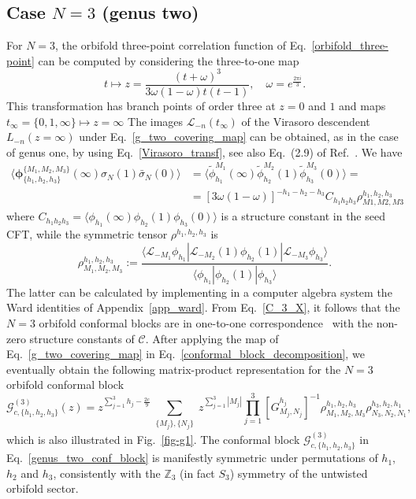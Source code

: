 \documentclass[a4paper,11pt]{article}
\begin{document}
\subsection{Case $N=3$ (genus two)}

For $N=3$, the orbifold three-point correlation 
function of Eq.~\eqref{orbifold_three-point} can be computed 
by considering the three-to-one map~\cite{Collier}
\begin{equation}\label{g_two_covering_map}
 t\mapsto z =\frac{(t+\omega)^3}{3\omega(1-\omega)t(t-1)},\quad \omega=e^{\frac{2\pi i}{3}}.
\end{equation}
This transformation has branch points of order three at 
$z=0$ and $1$ and maps $t_{\infty}=\{0, 1, \infty\} \mapsto z=\infty$ 
The images $\mathcal{L}_{-n}(t_{\infty})$ of the Virasoro descendent $L_{-n}(z=\infty)$ 
under Eq.~\eqref{g_two_covering_map} can be obtained, as in the 
case of genus one, by using Eq.~\eqref{Virasoro_transf}, see also Eq.~(2.9)
of Ref.~\cite{Collier}. We have 
\begin{align}\label{C_3_X}
 \langle \boldsymbol{\phi}^{\{M_1,M_2,M_3\}}_{\{h_1,h_2,h_3\}}(\infty) \sigma_{N}(1)\bar{\sigma}_{N}(0)\rangle &=\langle \tilde{\phi}_{h_1}^{M_1} (\infty) \tilde{\phi}_{h_2}^{M_2}(1) \tilde{\phi}_{h_3}^{M_3}(0)\rangle
 = \\
 &=[3\omega(1-\omega)]^{-h_1-h_2-h_3}C_{h_1h_2h_3}\rho_{M1,M2,M3}^{h_1,h_2,h_3}
\end{align}
where $C_{h_1 h_2 h_3}=\langle \phi_{h_1}(\infty)\phi_{h_2}(1)\phi_{h_3}(0)\rangle$ is a structure constant in the seed CFT, while the symmetric tensor $\rho^{h_1,h_2,h_3}$ is 
\begin{equation}
\label{rho2}
 \rho^{h_1,h_2,h_3}_{M_1,M_2,M_3}:=
 \frac{\langle \mathcal{L}_{-M_1}\phi_{h_1}|\mathcal{L}_{-M_2}(1)\phi_{h_2}(1)|\mathcal{L}_{-M_3}\phi_{h_3}\rangle}
 { \langle \phi_{h_1}|\phi_{h_2}(1)|\phi_{h_3}\rangle}.
\end{equation}
The latter can be calculated by implementing in a computer algebra system the Ward identities of Appendix~\ref{app_ward}. 
From Eq.~\eqref{C_3_X}, it follows that the $N=3$ orbifold conformal blocks are in one-to-one correspondence~\cite{Cardy, Collier} 
with the non-zero structure constants of $\mathcal{C}$.
After applying the map of Eq.~\eqref{g_two_covering_map} in Eq.~\eqref{conformal_block_decomposition},
we eventually obtain the following matrix-product representation for the $N=3$ orbifold conformal block \cite{Collier}
\begin{equation}\label{genus_two_conf_block}
 \mathcal{G}_{c, \{h_1, h_2, h_3\}}^{(3)}(z)=
z^{\sum_{j=1}^3 h_j-\frac{2c}{9}}\sum_{\substack{\{M_j\}, \{N_j\}}}
 z^{\sum\limits_{j=1}^3 |M_j|}
 \prod_{j=1}^3 [G_{M_j,N_j}^{h_j}]^{-1}
 \rho^{h_1,h_2,h_3}_{M_1,M_2,M_3}\rho_{N_3,N_2,N_1}^{h_3,h_2,h_1},
\end{equation}
which is also illustrated in Fig.~\ref{fig-g1}.
The conformal block $\mathcal{G}_{c, \{h_1, h_2, h_3\}}^{(3)}$ in Eq.~\eqref{genus_two_conf_block} is
manifestly symmetric under permutations of $h_1$, $h_2$ and $h_3$, consistently with the $\mathbb Z_3$ (in fact $S_3$) symmetry of the untwisted orbifold sector.
\end{document}
